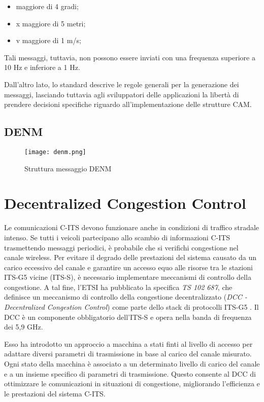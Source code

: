 \begin{itemize}
    \item \textit{\textDelta \textalpha} maggiore di 4 gradi;
    \item \textDelta x maggiore di 5 metri;
    \item \textDelta v maggiore di 1 m/s;
\end{itemize}

Tali messaggi, tuttavia, non possono essere inviati con una frequenza superiore a 10 Hz e inferiore a 1 Hz.

Dall'altro lato, lo standard descrive le regole generali per la generazione dei messaggi, lasciando tuttavia agli sviluppatori delle applicazioni la libertà di prendere decisioni specifiche riguardo all'implementazione delle strutture CAM.

\subsection[DENM]{DENM}
\begin{figure}[h!]
    \centering
    \texttt{[image: denm.png]}
    \caption{Struttura messaggio DENM}
    \label{fig:denm}
\end{figure}

\section[ETSI DCC]{Decentralized Congestion Control}
\label{dcc}
Le comunicazioni C-ITS devono funzionare anche in condizioni di traffico stradale intenso. Se tutti i veicoli partecipano allo scambio di informazioni C-ITS trasmettendo messaggi periodici, è probabile che si verifichi congestione nel canale wireless. Per evitare il degrado delle prestazioni del sistema causato da un carico eccessivo del canale e garantire un accesso equo alle risorse tra le stazioni ITS-G5 vicine (ITS-S), è necessario implementare meccanismi di controllo della congestione. A tal fine, l'ETSI ha pubblicato la specifica \textit{TS 102 687}, che definisce un meccanismo di controllo della congestione decentralizzato (\textit{DCC - Decentralized Congestion Control}) come parte dello stack di protocolli ITS-G5 \cite{8535090}. Il DCC è un componente obbligatorio dell'ITS-S e opera nella banda di frequenza dei 5,9 GHz.

Esso ha introdotto un approccio a macchina a stati finti al livello di accesso per adattare diversi parametri di trasmissione in base al carico del canale misurato. Ogni stato della macchina è associato a un determinato livello di carico del canale e a un insieme specifico di parametri di trasmissione. Questo consente al DCC di ottimizzare le comunicazioni in situazioni di congestione, migliorando l'efficienza e le prestazioni del sistema C-ITS.

